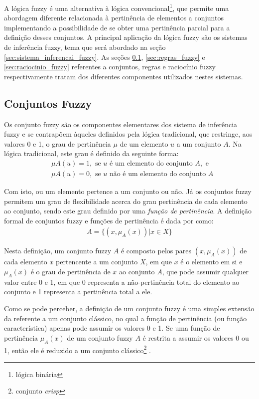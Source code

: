A lógica fuzzy é uma alternativa à lógica convencional\footnote{lógica binária}, que permite uma abordagem diferente relacionada à pertinência de elementos a conjuntos implementando a possibilidade de se obter uma pertinência parcial para a definição desses conjuntos. A principal aplicação da lógica fuzzy são os sistemas de inferência fuzzy, tema que será abordado na seção \ref{sec:sistema_inferencai_fuzzy}. As seções \ref{sec:cojuntos_fuzzy}, \ref{sec:regras_fuzzy} e \ref{sec:raciocinio_fuzzy} referentes a conjuntos, regras e raciocínio fuzzy respectivamente tratam dos diferentes componentes utilizados nestes sistemas. 

\subsection{Conjuntos Fuzzy}
\label{sec:cojuntos_fuzzy}

Os conjunto fuzzy são os componentes elementares dos sistema de inferência fuzzy e se contrapõem àqueles definidos pela lógica tradicional, que restringe, aos valores 0 e 1, o grau de pertinência $\mu$ de um elemento $u$ a um conjunto $A$. Na lógica tradicional, este grau é definido da seguinte forma:
\begin{align*}
&\mu A(u) = 1, \mbox{ se } u \mbox{ é um elemento do conjunto } A, \mbox{ e }\\
&\mu A(u) = 0, \mbox{ se } u \mbox{ não é um elemento do conjunto } A
\end{align*}

Com isto, ou um elemento pertence a um conjunto ou não. Já os conjuntos fuzzy permitem um grau de flexibilidade acerca do grau pertinência de cada elemento ao conjunto, sendo este grau definido por uma \textit{função de pertinência}. A definição formal de conjuntos fuzzy e funções de pertinência é dada por  como:
\begin{align*}
	A = \{(x,\mu_A(x)) \vert x \in X\}
\end{align*}

Nesta definição, um conjunto fuzzy $A$ é composto pelos pares $(x,\mu_A(x))$ de cada elemento $x$ pertencente a um conjunto $X$, em que $x$ é o elemento em si e $\mu_A(x)$ é o grau de pertinência de $x$ ao conjunto $A$, que pode assumir qualquer valor entre 0 e 1, em que 0 representa a não-pertinência total do elemento ao conjunto e 1 representa a pertinência total a ele.

Como se pode perceber, a definição de um conjunto fuzzy é uma simples extensão da referente a um conjunto clássico, no qual a função de pertinência (ou função característica) apenas pode assumir os valores 0 e 1. Se uma função de pertinência $\mu_A(x)$ de um conjunto fuzzy $A$ é restrita a assumir os valores 0 ou 1, então ele é reduzido a um conjunto clássico\footnote{conjunto \textit{crisp}} \cite[p.~14]{Jang1997}.

